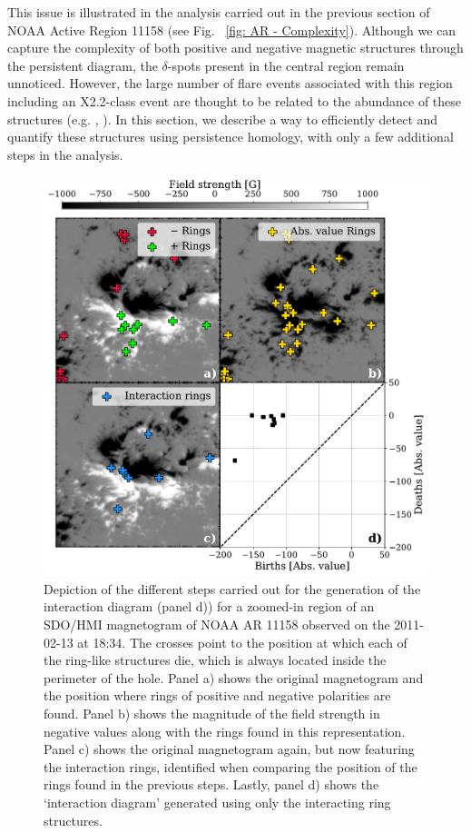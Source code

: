 \documentclass[12pt]{mythesis}
\begin{document}
This issue is illustrated in the analysis carried out in the previous section of NOAA Active Region 11158 (see Fig. ~\ref{fig:  AR - Complexity}). Although we can capture the complexity of both positive and negative magnetic structures through the persistent diagram, the $\delta$-spots present in the central region remain unnoticed. However, the large number of flare events associated with this region including an X2.2-class event are thought to be related to the abundance of these structures (e.g. \citealt{x21}, \citealt{x22}). In this section, we describe a way to efficiently detect and quantify these structures using persistence homology, with only a few additional steps in the analysis.

\begin{figure}
    \centering
    \includegraphics[width=12cm]{figures/PersistentHomology/InteractingDiagram.pdf}
    \caption{
      Depiction of the different steps carried out for the generation of the interaction diagram (panel d)) for a zoomed-in region of an SDO/HMI magnetogram of NOAA AR 11158 observed on the 2011-02-13 at 18:34. The crosses point to the position at which each of the ring-like structures die, which is always located inside the perimeter of the hole. Panel a) shows the original magnetogram and the position where rings of positive and negative polarities are found. Panel b) shows the magnitude of the field strength in negative values along with the rings found in this representation. Panel c) shows the original magnetogram again, but now featuring the interaction rings, identified when comparing the position of the rings found in the previous steps. Lastly, panel d) shows the `interaction diagram' generated using only the interacting ring structures.}
    \label{fig: Interacting_diagram}
\end{figure}
\end{document}
